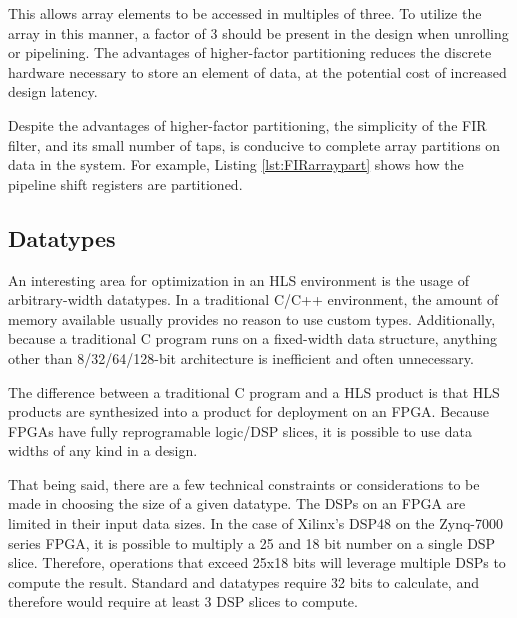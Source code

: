 \documentclass[../report_polarFIR.tex]{subfiles}
\begin{document}
This allows array elements to be accessed in multiples of three. To utilize the array in this manner, a factor of 3 should be present in the design when unrolling or pipelining. The advantages of higher-factor partitioning reduces the discrete hardware necessary to store an element of data, at the potential cost of increased design latency.

Despite the advantages of higher-factor partitioning, the simplicity of the FIR filter, and its small number of taps, is conducive to complete array partitions on data in the system. For example, Listing \ref{lst:FIRarraypart} shows how the pipeline shift registers are partitioned.


\begin{quote}
\begin{singlespace}
    
\end{singlespace}
\end{quote}

\subsection{Datatypes}\label{FIRdata}

An interesting area for optimization in an HLS environment is the usage of arbitrary-width datatypes. In a traditional C/C++ environment, the amount of memory available usually provides no reason to use custom types. Additionally, because a traditional C program runs on a fixed-width data structure, anything other than 8/32/64/128-bit architecture is inefficient and often unnecessary.

The difference between a traditional C program and a HLS product is that HLS products are synthesized into a product for deployment on an FPGA. Because FPGAs have fully reprogramable logic/DSP slices, it is possible to use data widths of any kind in a design.

That being said, there are a few technical constraints or considerations to be made in choosing the size of a given datatype. The DSPs on an FPGA are limited in their input data sizes. In the case of Xilinx's DSP48 on the Zynq-7000 series FPGA, it is possible to multiply a 25 and 18 bit number on a single DSP slice. Therefore, operations that exceed 25x18 bits will leverage multiple DSPs to compute the result. Standard  and  datatypes require 32 bits to calculate, and therefore would require at least 3 DSP slices to compute.
\end{document}
